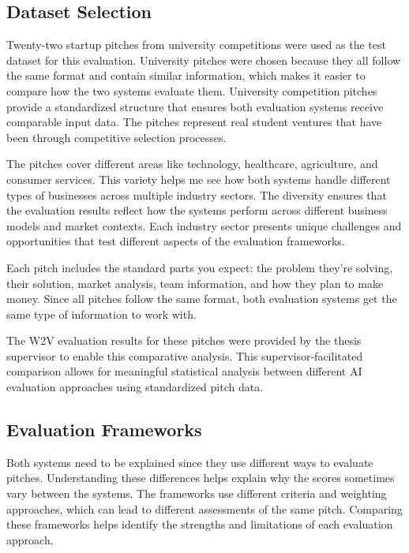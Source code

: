 \subsection{Dataset Selection}
\label{subsec:dataset}

Twenty-two startup pitches from university competitions were used as the test dataset for this evaluation. University pitches were chosen because they all follow the same format and contain similar information, which makes it easier to compare how the two systems evaluate them. University competition pitches provide a standardized structure that ensures both evaluation systems receive comparable input data. The pitches represent real student ventures that have been through competitive selection processes.

The pitches cover different areas like technology, healthcare, agriculture, and consumer services. This variety helps me see how both systems handle different types of businesses across multiple industry sectors. The diversity ensures that the evaluation results reflect how the systems perform across different business models and market contexts. Each industry sector presents unique challenges and opportunities that test different aspects of the evaluation frameworks.

Each pitch includes the standard parts you expect: the problem they're solving, their solution, market analysis, team information, and how they plan to make money. Since all pitches follow the same format, both evaluation systems get the same type of information to work with.

The W2V evaluation results for these pitches were provided by the thesis supervisor to enable this comparative analysis. This supervisor-facilitated comparison allows for meaningful statistical analysis between different AI evaluation approaches using standardized pitch data.

\subsection{Evaluation Frameworks}
\label{subsec:frameworks}

Both systems need to be explained since they use different ways to evaluate pitches. Understanding these differences helps explain why the scores sometimes vary between the systems. The frameworks use different criteria and weighting approaches, which can lead to different assessments of the same pitch. Comparing these frameworks helps identify the strengths and limitations of each evaluation approach.


